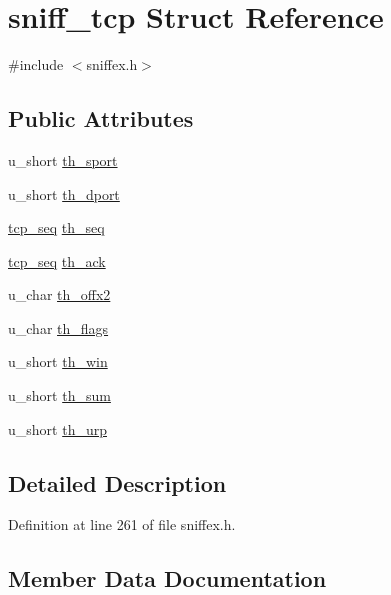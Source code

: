 \hypertarget{structsniff__tcp}{}\section{sniff\+\_\+tcp Struct Reference}
\label{structsniff__tcp}


{\ttfamily \#include $<$sniffex.\+h$>$}

\subsection*{Public Attributes}
\begin{DoxyCompactItemize}
\item 
u\+\_\+short \hyperlink{structsniff__tcp_a30dcb7e611d1f0c359e2146a8898dbeb}{th\+\_\+sport}
\item 
u\+\_\+short \hyperlink{structsniff__tcp_a8e67681937de43161ed5eeecd01272d0}{th\+\_\+dport}
\item 
\hyperlink{sniffex_8h_a5c8f54bd05997cf1aaa8d0bd3620dc3b}{tcp\+\_\+seq} \hyperlink{structsniff__tcp_a3732bf2f28ede2be85a628faa7b9347c}{th\+\_\+seq}
\item 
\hyperlink{sniffex_8h_a5c8f54bd05997cf1aaa8d0bd3620dc3b}{tcp\+\_\+seq} \hyperlink{structsniff__tcp_a5d7e4a998411a138b50ca3950c172212}{th\+\_\+ack}
\item 
u\+\_\+char \hyperlink{structsniff__tcp_a96031b46089f404631f459c46b4a9eea}{th\+\_\+offx2}
\item 
u\+\_\+char \hyperlink{structsniff__tcp_aaec4001301328a04ff3e653f688d9c19}{th\+\_\+flags}
\item 
u\+\_\+short \hyperlink{structsniff__tcp_ad2e0599bbc042e63260bcd3fd07b55c5}{th\+\_\+win}
\item 
u\+\_\+short \hyperlink{structsniff__tcp_a1947a34af9e1c1467142c62602e94065}{th\+\_\+sum}
\item 
u\+\_\+short \hyperlink{structsniff__tcp_aa9d57ded7709e0c610048df3ac80ab65}{th\+\_\+urp}
\end{DoxyCompactItemize}


\subsection{Detailed Description}


Definition at line 261 of file sniffex.\+h.



\subsection{Member Data Documentation}
